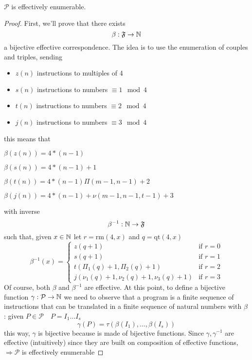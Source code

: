 \begin{theorem}
  $\mathcal{P}$ is effectively enumerable.
  \begin{proof}
    First, we'll prove that there exists
    \[\beta : \mathfrak{F} \rightarrow \mathbb{N} \]
    a bijective effective correspondence. The idea is to use the
    enumeration of couples and triples, sending
    \begin{itemize}
    \item $z(n)$ instructions to multiples of 4
    \item $s(n)$ instructions to numbers $\equiv 1 \mod 4$
    \item $t(n)$ instructions to numbers $\equiv 2 \mod 4$
    \item $j(n)$ instructions to numbers $\equiv 3 \mod 4$
    \end{itemize}
    this means that

    $\beta(z(n)) = 4*(n-1)$

    $\beta(s(n)) = 4*(n-1) + 1$

    $\beta(t(n)) = 4*(n-1) \Pi(m-1, n-1) + 2$

    $\beta(j(n)) = 4*(n-1) + \nu(m-1, n-1, t-1) + 3$

    with inverse \[\beta^{-1} : \mathbb{N} \rightarrow \mathfrak{F}\] such
    that, given $x \in \mathbb{N}$ let $r = \mbox{rm}(4,x)$ and
    $q = \mbox{qt}(4,x)$
    \[
      \beta^{-1}(x) = \begin{cases}
        z(q+1) & \mbox{if } r=0 \\
        s(q+1) & \mbox{if } r=1 \\
        t(\Pi_1(q)+1, \Pi_2(q)+1) & \mbox{if } r=2 \\
        j(\nu_1(q)+1, \nu_2(q)+1, \nu_3(q)+1) & \mbox{if } r=3
      \end{cases}
    \]
    Of course, both $\beta$ and $\beta^{-1}$ are effective. At this
    point, to define a bijective function
    $\gamma : \mathcal{P} \rightarrow \mathbb{N}$ we need to observe that a
    program is a finite sequence of instructions that can
    be translated in a finite sequence of natural numbers with $\beta$ : given
    $P \in \mathcal{P} \quad P = I_1 \dots I_s$
    \[\gamma(P) = \tau(\beta(I_1), \dots, \beta(I_s))\]
    this way, $\gamma$ is bijective because is made of bijective
    functions. Since $\gamma, \gamma^{-1}$ are effective (intuitively)
    since they are built on composition of effective functions,
    $\Rightarrow \mathcal{P}$ is effectively enumerable
  \end{proof}
\end{theorem}


